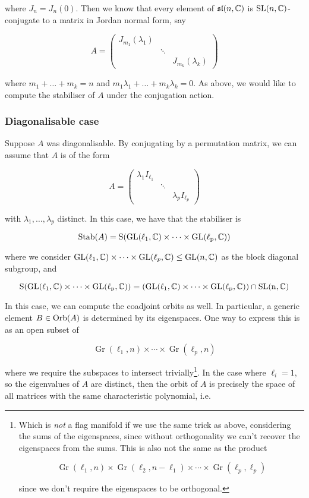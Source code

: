 \documentclass{article}
\renewcommand{\sl}{\mathfrak{sl}}
\DeclareMathOperator{\Gr}{Gr}
\begin{document}
where \(J_n = J_n(0)\). Then we know that every element of \(\sl(n, \C)\) is \(\operatorname{SL}(n, \mathbb{C})\)-conjugate to a matrix in Jordan normal form, say

\[A = \begin{pmatrix}
    J_{m_1}(\lambda_1) \\
    & \ddots \\
    & & J_{m_k}(\lambda_k)
\end{pmatrix}\]

where \(m_1 + \dots + m_k = n\) and \(m_1\lambda_1 + \dots + m_k\lambda_k = 0\). As above, we would like to compute the stabiliser of \(A\) under the conjugation action.

\subsubsection{Diagonalisable case}

Suppose \(A\) was diagonalisable. By conjugating by a permutation matrix, we can assume that \(A\) is of the form

\[A = \begin{pmatrix}
    \lambda_1 I_{\ell_1} \\
    & \ddots \\
    & & \lambda_p I_{\ell_p}
\end{pmatrix}\]

with \(\lambda_1, \dots, \lambda_p\) distinct. In this case, we have that the stabiliser is

\[\operatorname{Stab}(A) = \rm S(\operatorname{GL}(\ell_1, \mathbb{C}) \times \cdots \times \operatorname{GL}(\ell_p, \mathbb{C}))\]

where we consider \(\operatorname{GL}(\ell_1, \mathbb{C}) \times \cdots \times \operatorname{GL}(\ell_p, \mathbb{C}) \le \operatorname{GL}(n, \mathbb{C})\) as the block diagonal subgroup, and

\[\rm S(\operatorname{GL}(\ell_1, \mathbb{C}) \times \cdots \times \operatorname{GL}(\ell_p, \mathbb{C})) = \left(\operatorname{GL}(\ell_1, \mathbb{C}) \times \cdots \times \operatorname{GL}(\ell_p, \mathbb{C})\right) \cap \operatorname{SL}(n, \mathbb{C})\]

In this case, we can compute the coadjoint orbits as well. In particular, a generic element \(B \in \operatorname{Orb}(A)\) is determined by its eigenspaces. One way to express this is as an open subset of

\[\Gr(\ell_1, n) \times \cdots \times \Gr(\ell_p, n)\]

where we require the subspaces to intersect trivially\footnote{Which is \emph{not} a flag manifold if we use the same trick as above, considering the sums of the eigenspaces, since without orthogonality we can't recover the eigenspaces from the sums. This is also not the same as the product

\[\Gr(\ell_1, n) \times \Gr(\ell_2, n - \ell_1) \times \cdots \times \Gr(\ell_p, \ell_p)\]

since we don't require the eigenspaces to be orthogonal.}. In the case where \(\ell_i = 1\), so the eigenvalues of \(A\) are distinct, then the orbit of \(A\) is precisely the space of all matrices with the same characteristic polynomial, i.e.
\end{document}
